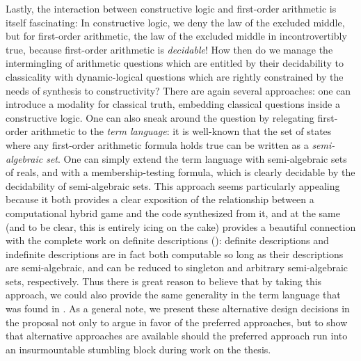 Lastly, the interaction between constructive logic and first-order arithmetic is itself fascinating: In constructive logic, we deny the law of the excluded middle, but for first-order arithmetic, the law of the excluded middle in incontrovertibly true, because first-order arithmetic is \emph{decidable}!
How then do we manage the intermingling of arithmetic questions which are entitled by their decidability to classicality with dynamic-logical questions which are rightly constrained by the needs of synthesis to constructivity?
There are again several approaches: one can introduce a modality for classical truth, embedding classical questions inside a constructive logic.
One can also sneak around the question by relegating first-order arithmetic to the \emph{term language}: it is well-known that the set of states where any first-order arithmetic formula holds true can be written as a \emph{semi-algebraic set}.
One can simply extend the term language with semi-algebraic sets of reals, and with a membership-testing formula, which is clearly decidable by the decidability of semi-algebraic sets.
This approach seems particularly appealing because it both provides a clear exposition of the relationship between a computational hybrid game and the code synthesized from it, and at the same (and to be clear, this is entirely icing on the cake) provides a beautiful connection with the complete work on definite descriptions (): definite descriptions and indefinite descriptions are in fact both computable so long as their descriptions are semi-algebraic, and can be reduced to singleton and arbitrary semi-algebraic sets, respectively.
Thus there is great reason to believe that by taking this approach, we could also provide the same generality in the term language that was found in .
As a general note, we present these alternative design decisions in the proposal not only to argue in favor of the preferred approaches, but to show that alternative approaches are available should the preferred approach run into an insurmountable stumbling block during work on the thesis.



